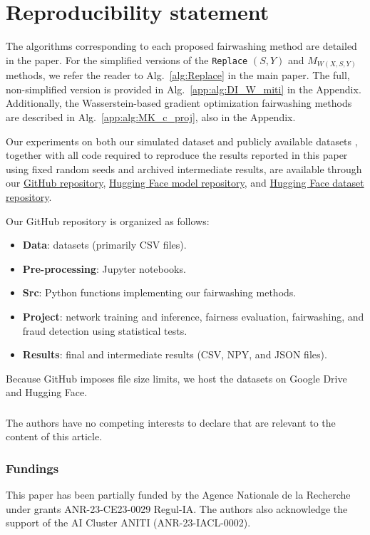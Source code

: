 \documentclass[runningheads, orivec]{llncs}
\begin{document}
\section*{Reproducibility statement}

The algorithms corresponding to each proposed fairwashing method are detailed in the paper. For the simplified versions of the \texttt{Replace} $(S,Y)$ and $M_{W(X,S,Y)}$ methods, we refer the reader to Alg.~\ref{alg:Replace} in the main paper. The full, non-simplified version is provided in Alg.~\ref{app:alg:DI_W_miti} in the Appendix. Additionally, the Wasserstein-based gradient optimization fairwashing methods are described in Alg.~\ref{app:alg:MK_c_proj}, also in the Appendix.

Our experiments on both our simulated dataset and publicly available datasets \cite{adult_2, ding2021retiring, jesus2022turningtablesbiasedimbalanced, liu2015faceattributes}, together with all code required to reproduce the results reported in this paper using fixed random seeds and archived intermediate results, are available through our \href{https://github.com/ValentinLafargue/Inspection}{GitHub repository}, \href{https://huggingface.co/ValentinLAFARGUE/EIF-biased-classifiers}{Hugging Face model repository}, and \href{https://huggingface.co/datasets/ValentinLAFARGUE/EIF-Manipulated-distributions}{Hugging Face dataset repository}.

Our GitHub repository is organized as follows:
\begin{itemize}
\item \textbf{Data}: datasets (primarily CSV files).
\item \textbf{Pre-processing}: Jupyter notebooks.
\item \textbf{Src}: Python functions implementing our fairwashing methods.
\item \textbf{Project}: network training and inference, fairness evaluation, fairwashing, and fraud detection using statistical tests.
\item \textbf{Results}: final and intermediate results (CSV, NPY, and JSON files).
\end{itemize}

Because GitHub imposes file size limits, we host the datasets on Google Drive and Hugging Face.

\begin{credits}
\subsubsection{\discintname}
The authors have no competing interests to declare that are
relevant to the content of this article.

\subsubsection{Fundings}
This paper has been partially funded by the Agence Nationale de la Recherche under grants ANR-23-CE23-0029 Regul-IA. The authors also acknowledge the support of the AI Cluster ANITI (ANR-23-IACL-0002).

\end{credits}
\end{document}
